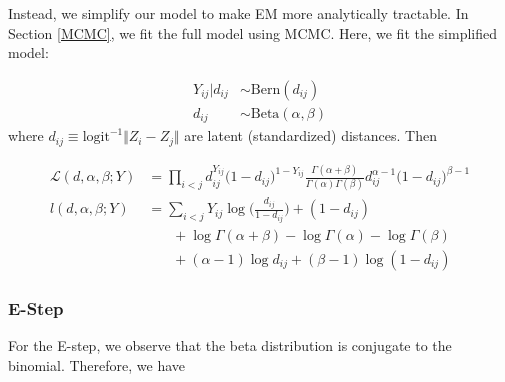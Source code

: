 \documentclass{article}
\begin{document}
Instead, we simplify our model to make EM more analytically tractable. In Section \ref{MCMC}, we fit the full model using MCMC. Here, we fit the simplified model:

\begin{align*}
Y_{ij} | d_{ij} &\sim \text{Bern}(d_{ij}) \\
d_{ij} &\sim \text{Beta}(\alpha, \beta)
\end{align*}
where $d_{ij} \equiv \text{logit}^{-1}\Vert Z_i - Z_j \Vert$ are latent (standardized) distances. Then

\begin{align*}
\mathcal{L}(d, \alpha, \beta; Y) &= \prod_{i<j}d_{ij}^{Y_{ij}}\big(1 - d_{ij}\big)^{1 - Y_{ij}} \frac{\Gamma(\alpha + \beta)}{\Gamma(\alpha)\Gamma(\beta)}d_{ij}^{\alpha - 1}\big(1-d_{ij}\big)^{\beta - 1} \\
l(d, \alpha, \beta ; Y) &= \sum_{i<j} Y_{ij}\log \Big(\frac{d_{ij}}{1 - d_{ij}}\Big) + (1-d_{ij})  \\
&\ \ \ \ \ \ \ \ + \log \Gamma(\alpha + \beta) - \log \Gamma(\alpha) - \log \Gamma(\beta) \\
&\ \ \ \ \ \ \ \ + (\alpha - 1)\log d_{ij} + (\beta - 1)\log(1 - d_{ij})
\end{align*}


\subsubsection{E-Step}

For the E-step, we observe that the beta distribution is conjugate to the binomial. Therefore, we have
\end{document}
